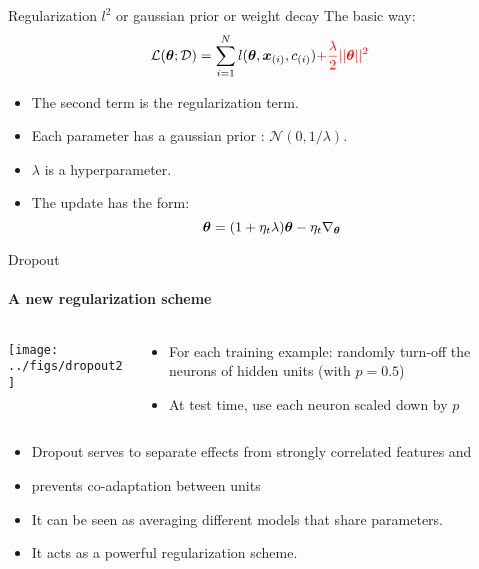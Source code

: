 
\begin{frame}{Regularization $l^2$ or gaussian prior or weight decay}
  The basic way: 
  $$
  \mathcal{L}(\boldsymbol{\theta};\mathcal{D}) = \sum_{i=1}^{N} l(\boldsymbol{\theta},\boldsymbol{x}_{(i)},{c}_{(i)})  {\color{red}+ \frac{\lambda}{2} || \boldsymbol{\theta}||^2}
  $$
  \begin{itemize}
  \item The second term is the {\color{red}regularization term}. 
  \item Each parameter has a gaussian prior : $
    \mathcal{N}(0,1/\lambda)$.
  \item $\lambda$ is a hyperparameter. 
  \item  The update has the form:
    $$
    \boldsymbol{\theta} = (1+\eta_t\lambda) \boldsymbol{\theta} - \eta_t \nabla_{\boldsymbol{\theta}} 
    $$
  \end{itemize}
\end{frame}

\begin{frame}{Dropout}
  \framesubtitle{A new regularization
    scheme~\cite{Srivastava14Multimodal}}
  \begin{columns}
    \begin{column}{0.5\textwidth}
      \begin{center}
        \texttt{[image: ../figs/dropout2]}
      \end{center}
    \end{column}
    \begin{column}{0.5\textwidth}
      \begin{itemize}
      \item  For each training example:  randomly turn-off the neurons
        of hidden units (with $p=0.5$)
      \item  At test time, use each neuron scaled down by $p$
      \end{itemize}
    \end{column}
  \end{columns}
  \begin{itemize}
  \item  Dropout serves to separate effects from strongly correlated
    features and 
  \item prevents co-adaptation between units
  \item It can be seen as averaging different models that share parameters.
  \item It acts as a powerful regularization scheme. 
  \end{itemize}
\end{frame}


